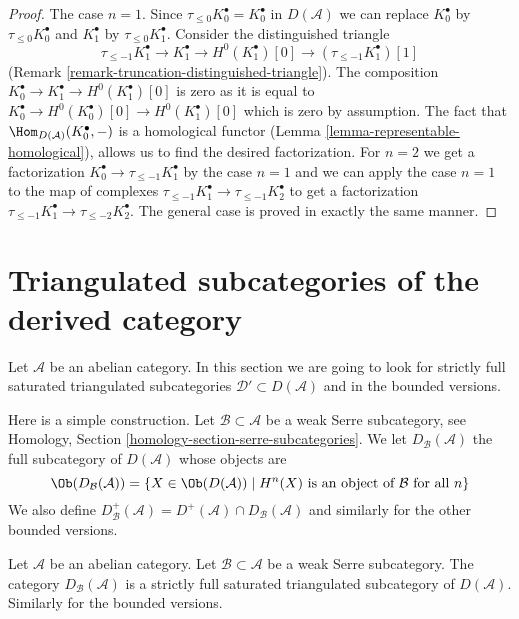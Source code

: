 \begin{proof}
The case $n = 1$. Since $\tau_{\leq 0}K_0^\bullet = K_0^\bullet$
in $D(\mathcal{A})$ we can replace
$K_0^\bullet$ by $\tau_{\leq 0}K_0^\bullet$ and
$K_1^\bullet$ by $\tau_{\leq 0}K_1^\bullet$.
Consider the distinguished triangle
$$
\tau_{\leq -1}K_1^\bullet \to K_1^\bullet \to
H^0(K_1^\bullet)[0] \to (\tau_{\leq -1}K_1^\bullet)[1]
$$
(Remark \ref{remark-truncation-distinguished-triangle}).
The composition $K_0^\bullet \to K_1^\bullet \to H^0(K_1^\bullet)[0]$
is zero as it is equal to $K_0^\bullet \to H^0(K_0^\bullet)[0] \to
H^0(K_1^\bullet)[0]$ which is zero by assumption.
The fact that $\Hom_{D(\mathcal{A})}(K_0^\bullet, -)$
is a homological functor (Lemma \ref{lemma-representable-homological}),
allows us to find the desired factorization.
For $n = 2$ we get a factorization
$K_0^\bullet \to \tau_{\leq -1}K_1^\bullet$ by the case $n = 1$
and we can apply the case $n = 1$ to the map of complexes
$\tau_{\leq -1}K_1^\bullet \to \tau_{\leq -1}K_2^\bullet$
to get a factorization
$\tau_{\leq -1}K_1^\bullet \to \tau_{\leq -2}K_2^\bullet$.
The general case is proved in exactly the same manner.
\end{proof}




\section{Triangulated subcategories of the derived category}
\label{section-triangulated-sub}

\noindent
Let $\mathcal{A}$ be an abelian category. In this section we are
going to look for strictly full saturated triangulated subcategories
$\mathcal{D}' \subset D(\mathcal{A})$ and in the bounded versions.

\medskip\noindent
Here is a simple construction. Let $\mathcal{B} \subset \mathcal{A}$
be a weak Serre subcategory, see
Homology, Section \ref{homology-section-serre-subcategories}.
We let $D_\mathcal{B}(\mathcal{A})$ the full subcategory of
$D(\mathcal{A})$ whose objects are
$$
\Ob(D_\mathcal{B}(\mathcal{A}))
=
\{X \in \Ob(D(\mathcal{A})) \mid
H^n(X) \text{ is an object of }\mathcal{B}\text{ for all }n\}
$$
We also define
$D^{+}_\mathcal{B}(\mathcal{A}) =
D^{+}(\mathcal{A}) \cap D_\mathcal{B}(\mathcal{A})$
and similarly for the other bounded versions.

\begin{lemma}
\label{lemma-cohomology-in-serre-subcategory}
Let $\mathcal{A}$ be an abelian category.
Let $\mathcal{B} \subset \mathcal{A}$ be a weak Serre subcategory.
The category $D_\mathcal{B}(\mathcal{A})$ is a strictly full
saturated triangulated subcategory of $D(\mathcal{A})$.
Similarly for the bounded versions.
\end{lemma}

